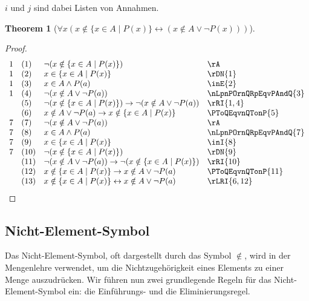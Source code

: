 \documentclass{book}
\theoremstyle{plain}
\newtheorem{theorem}{Theorem}
\theoremstyle{remark}
\theoremstyle{definition}
\begin{document}
\(i\) und \(j\) sind dabei Listen von Annahmen.	

\label{FaxLpxNotinLbxInAMidPLpxRpRbLrLpxNotinAOrnPLpxRpRpRp}
\begin{theorem}[\(\forall x(x \notin \{x \in A \mid P(x)\} \leftrightarrow (x \notin A \lor \neg P(x)))\)]
\end{theorem}
\begin{proof}
	\[
	\begin{array}{llll}
		1 & (1) & \neg(x \notin \{x \in A \mid P(x)\}) & \rA \\
		1 & (2) & x \in \{x \in A \mid P(x)\} & \rDN{1} \\
		1 & (3) & x \in A\land P(a) & \inE{2} \\
		1 & (4) & \neg(x \notin A\lor \neg P(a)) & \nLpnPOrnQRpEqvPAndQ{3} \\
		& (5) & \neg (x \notin \{x \in A \mid P(x)\})\rightarrow \neg(x \notin A\lor \neg P(a)) & \rRI{1,4} \\
		& (6) & x \notin A\lor \neg P(a)\rightarrow x \notin \{x \in A \mid P(x)\}  & \PToQEqvnQTonP{5} \\
		7 & (7) & \neg(x\notin A\lor \neg P(a)) & \rA \\
		7 & (8) & x\in A\land P(a) & \nLpnPOrnQRpEqvPAndQ{7} \\
		7 & (9) & x\in \{x \in A \mid P(x)\} & \inI{8} \\
		7 & (10) & \neg(x\notin \{x \in A \mid P(x)\}) & \rDN{9} \\			  
		& (11) & \neg(x\notin A\lor \neg P(a))\rightarrow \neg(x\notin \{x \in A \mid P(x)\}) & \rRI{10} \\	
		& (12) & x\notin \{x \in A \mid P(x)\}\rightarrow x\notin A\lor \neg P(a) & \PToQEqvnQTonP{11} \\		
		& (13) & x\notin \{x \in A \mid P(x)\}\leftrightarrow x\notin A\lor \neg P(a) & \rLRI{6,12} \\		  
	\end{array}
	\]
\end{proof}

\subsection{Nicht-Element-Symbol}
\label{rule:notinEa} \label{rule:notinIa}
Das Nicht-Element-Symbol, oft dargestellt durch das Symbol \(\notin\), wird in der Mengenlehre verwendet, um die Nichtzugehörigkeit eines Elements zu einer Menge auszudrücken. Wir führen nun zwei grundlegende Regeln für das Nicht-Element-Symbol ein: die Einführungs- und die Eliminierungsregel.
\end{document}
